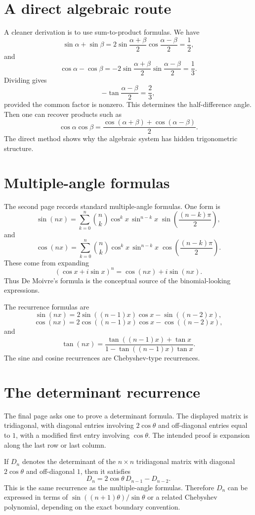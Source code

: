 \section{A direct algebraic route}

A cleaner derivation is to use sum-to-product formulas.  We have
\[
  \sin\alpha+\sin\beta
  =2\sin\frac{\alpha+\beta}{2}\cos\frac{\alpha-\beta}{2}=\frac12,
\]
and
\[
  \cos\alpha-\cos\beta
  =-2\sin\frac{\alpha+\beta}{2}\sin\frac{\alpha-\beta}{2}=\frac13.
\]
Dividing gives
\[
  -\tan\frac{\alpha-\beta}{2}=\frac{2}{3},
\]
provided the common factor is nonzero.  This determines the half-difference angle.  Then one can recover products such as
\[
  \cos\alpha\cos\beta
  =\frac{\cos(\alpha+\beta)+\cos(\alpha-\beta)}2.
\]
The direct method shows why the algebraic system has hidden trigonometric structure.

\section{Multiple-angle formulas}

The second page records standard multiple-angle formulas.  One form is
\[
  \sin(nx)=\sum_{k=0}^n \binom nk
  \cos^k x\,\sin^{n-k}x\;
  \sin\left(\frac{(n-k)\pi}{2}\right),
\]
and
\[
  \cos(nx)=\sum_{k=0}^n \binom nk
  \cos^k x\,\sin^{n-k}x\;
  \cos\left(\frac{(n-k)\pi}{2}\right).
\]
These come from expanding
\[
  (\cos x+i\sin x)^n=\cos(nx)+i\sin(nx).
\]
Thus De Moivre's formula is the conceptual source of the binomial-looking expressions.

The recurrence formulas are
\[
  \sin(nx)=2\sin((n-1)x)\cos x-\sin((n-2)x),
\]
\[
  \cos(nx)=2\cos((n-1)x)\cos x-\cos((n-2)x),
\]
and
\[
  \tan(nx)=\frac{\tan((n-1)x)+\tan x}{1-\tan((n-1)x)\tan x}.
\]
The sine and cosine recurrences are Chebyshev-type recurrences.

\section{The determinant recurrence}

The final page asks one to prove a determinant formula.  The displayed matrix is tridiagonal, with diagonal entries involving $2\cos\theta$ and off-diagonal entries equal to $1$, with a modified first entry involving $\cos\theta$.  The intended proof is expansion along the last row or last column.

If $D_n$ denotes the determinant of the $n\times n$ tridiagonal matrix with diagonal $2\cos\theta$ and off-diagonal $1$, then it satisfies
\[
  D_n=2\cos\theta\,D_{n-1}-D_{n-2}.
\]
This is the same recurrence as the multiple-angle formulas.  Therefore $D_n$ can be expressed in terms of $\sin((n+1)\theta)/\sin\theta$ or a related Chebyshev polynomial, depending on the exact boundary convention.

